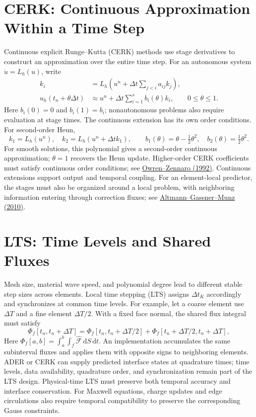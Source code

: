 \documentclass[11pt,openany]{book}
\numberwithin{equation}{chapter}
\theoremstyle{definition}
\theoremstyle{remark}
\newcommand{\dd}{\mathrm d}
\begin{document}
\section{CERK: Continuous Approximation Within a Time Step}\label{sec:cerk}
Continuous explicit Runge--Kutta (CERK) methods use stage derivatives to construct an approximation over the entire time step.
For an autonomous system $\dot u=L_h(u)$, write
\begin{equation}\label{eq:cerk}
\begin{aligned}
k_i&=L_h\left(u^n+\Delta t\sum_{j<i}a_{ij}k_j\right),\\
u_h(t_n+\theta\Delta t)&\approx u^n+
\Delta t\sum_{i=1}^{s}b_i(\theta)k_i,\qquad 0\leq\theta\leq1.
\end{aligned}
\end{equation}
Here $b_i(0)=0$ and $b_i(1)=b_i$; nonautonomous problems also require evaluation at stage times.
The continuous extension has its own order conditions. For second-order Heun,
\begin{equation}\label{eq:cerk-heun}
k_1=L_h(u^n),\quad k_2=L_h(u^n+\Delta t k_1),\qquad
b_1(\theta)=\theta-\tfrac12\theta^2,\quad
b_2(\theta)=\tfrac12\theta^2.
\end{equation}
For smooth solutions, this polynomial gives a second-order continuous approximation; $\theta=1$ recovers the Heun update.
Higher-order CERK coefficients must satisfy continuous order conditions; see
\href{https://doi.org/10.1137/0913084}{Owren--Zennaro (1992)}.
Continuous extensions support output and temporal coupling.
For an element-local predictor, the stages must also be organized around a local problem, with neighboring information entering through correction fluxes; see
\href{https://congress2.cimne.com/eccomas/proceedings/cfd2010/papers/01008.pdf}{Altmann--Gassner--Munz (2010)}.

\section{LTS: Time Levels and Shared Fluxes}\label{sec:lts}
Mesh size, material wave speed, and polynomial degree lead to different stable step sizes across elements.
Local time stepping (LTS) assigns $\Delta t_K$ accordingly and synchronizes at common time levels.
For example, let a coarse element use $\Delta T$ and a fine element $\Delta T/2$.
With a fixed face normal, the shared flux integral must satisfy
\begin{equation}\label{eq:lts-flux}
\Phi_f[t_n,t_n+\Delta T]
=\Phi_f[t_n,t_n+\Delta T/2]
+\Phi_f[t_n+\Delta T/2,t_n+\Delta T],
\end{equation}
Here $\Phi_f[a,b]=\int_a^b\int_f\widehat{\mathcal F}\,\dd S\,\dd t$.
An implementation accumulates the same subinterval fluxes and applies them with opposite signs to neighboring elements.
ADER or CERK can supply predicted interface states at quadrature times; time levels, data availability, quadrature order, and synchronization remain part of the LTS design.
Physical-time LTS must preserve both temporal accuracy and interface conservation.
For Maxwell equations, charge updates and edge circulations also require temporal compatibility to preserve the corresponding Gauss constraints.
\end{document}
